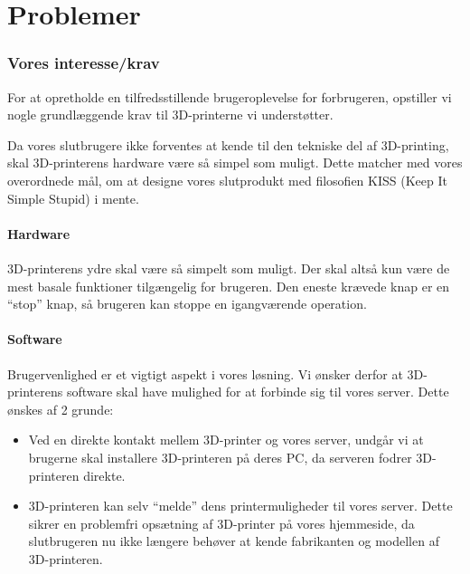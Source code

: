 \chapter{Problemer} %
\label{cha:problemer}

\subsection{Vores interesse/krav} %
\label{sub:vores_interesse_krav}

For at opretholde en tilfredsstillende brugeroplevelse for forbrugeren, opstiller vi nogle grundlæggende krav til 3D-printerne vi understøtter.

Da vores slutbrugere ikke forventes at kende til den tekniske del af 3D-printing, skal 3D-printerens hardware være så simpel som muligt. Dette matcher med vores overordnede mål, om at designe vores slutprodukt med filosofien KISS (Keep It Simple Stupid) i mente.

\subsubsection{Hardware} %
\label{ssub:hardware}

3D-printerens ydre skal være så simpelt som muligt. Der skal altså kun være de mest basale funktioner tilgængelig for brugeren. Den eneste krævede knap er en ``stop'' knap, så brugeren kan stoppe en igangværende operation.


\subsubsection{Software} %
\label{ssub:software}

Brugervenlighed er et vigtigt aspekt i vores løsning. Vi ønsker derfor at 3D-printerens software skal have mulighed for at forbinde sig til vores server. Dette ønskes af 2 grunde:

\begin{itemize}
	\item Ved en direkte kontakt mellem 3D-printer og vores server, undgår vi at brugerne skal installere 3D-printeren på deres PC, da serveren fodrer 3D-printeren direkte.
	\item 3D-printeren kan selv ``melde'' dens printermuligheder til vores server. Dette sikrer en problemfri opsætning af 3D-printer på vores hjemmeside, da slutbrugeren nu ikke længere behøver at kende fabrikanten og modellen af 3D-printeren.
\end{itemize}



